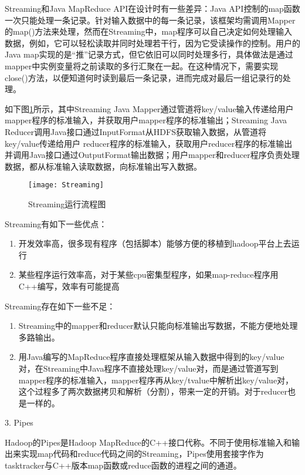 Streaming和Java MapReduce API在设计时有一些差异：Java API控制的map函数一次只能处理一条记录。针对输入数据中的每一条记录，该框架均需调用Mapper的map()方法来处理，然而在Streaming中，map程序可以自己决定如何处理输入数据，例如，它可以轻松读取并同时处理若干行，因为它受读操作的控制。用户的Java map实现的是“推”记录方式，但它依旧可以同时处理多行，具体做法是通过mapper中实例变量将之前读取的多行汇聚在一起。在这种情况下，需要实现close()方法，以便知道何时读到最后一条记录，进而完成对最后一组记录行的处理。

如下图\ref{fig:Streaming}所示，其中Streaming Java Mapper通过管道将key/value输入传递给用户mapper程序的标准输入，并获取用户mapper程序的标准输出；Streaming Java Reducer调用Java接口通过InputFormat从HDFS获取输入数据，从管道将key/value传递给用户 reducer程序的标准输入，获取用户reducer程序的标准输出并调用Java接口通过OutputFormat输出数据；用户mapper和reducer程序负责处理数据，都从标准输入读取数据，向标准输出写入数据。


\begin{figure}[h]
 \centering
 \texttt{[image: Streaming]}
 \caption{Streaming运行流程图}
 \label{fig:Streaming}
\end{figure}


Streaming有如下一些优点： 

\begin{enumerate}
\item 开发效率高，很多现有程序（包括脚本）能够方便的移植到hadoop平台上去运行 

\item 某些程序运行效率高，对于某些cpu密集型程序，如果map-reduce程序用C++编写，效率有可能提高 
\end{enumerate}

Streaming存在如下一些不足：

\begin{enumerate}
\item Streaming中的mapper和reducer默认只能向标准输出写数据，不能方便地处理多路输出。 

\item 用Java编写的MapReduce程序直接处理框架从输入数据中得到的key/value对，在Streaming中Java程序不直接处理key/value对，而是通过管道写到mapper程序的标准输入，mapper程序再从key/tvalue中解析出key/value对，这个过程多了两次数据拷贝和解析（分割），带来一定的开销。对于reducer也是一样的。
\end{enumerate}

3. Pipes

Hadoop的Pipes是Hadoop MapReduce的C++接口代称。不同于使用标准输入和输出来实现map代码和reduce代码之间的Streaming，Pipes使用套接字作为tasktracker与C++版本map函数或reduce函数的进程之间的通道。

